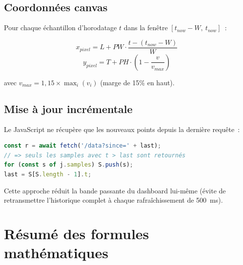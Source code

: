 \documentclass[a4paper,12pt]{article}
\begin{document}
\subsection{Coordonnées canvas}

Pour chaque échantillon d'horodatage $t$ dans la fenêtre $[t_{now}-W,\ t_{now}]$~:

\begin{equation}
  x_{pixel} = L + PW \cdot \frac{t - (t_{now} - W)}{W}
\end{equation}
\begin{equation}
  y_{pixel} = T + PH \cdot \left(1 - \frac{v}{v_{max}}\right)
\end{equation}

avec $v_{max} = 1{,}15 \times \max_i(v_i)$ (marge de 15\% en haut).

\subsection{Mise à jour incrémentale}

Le JavaScript ne récupère que les nouveaux points depuis la dernière requête~:

\begin{lstlisting}[language=JavaScript]
const r = await fetch('/data?since=' + last);
// => seuls les samples avec t > last sont retournés
for (const s of j.samples) S.push(s);
last = S[S.length - 1].t;
\end{lstlisting}

Cette approche réduit la bande passante du dashboard lui-même (évite de retransmettre
l'historique complet à chaque rafraîchissement de 500~ms).

\section{Résumé des formules mathématiques}
\end{document}
